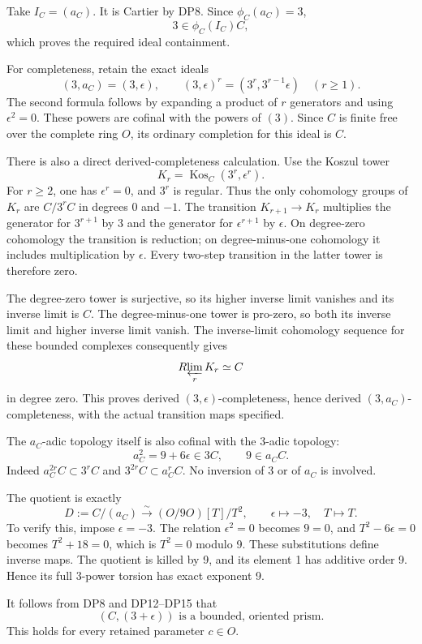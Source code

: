 \documentclass[
  10pt,
  a4paper,
]{article}
\begin{document}
Take \(I_C=(a_C)\). It is Cartier by DP8. Since \(\phi_C(a_C)=3\), \[
3\in\phi_C(I_C)C,
\tag{DP12}
\] which proves the required ideal containment.

For completeness, retain the exact ideals \[
(3,a_C)=(3,\epsilon),\qquad
(3,\epsilon)^r=(3^r,3^{r-1}\epsilon)\quad(r\ge1).
\tag{DP13}
\] The second formula follows by expanding a product of \(r\) generators
and using \(\epsilon^2=0\). These powers are cofinal with the powers of
\((3)\). Since \(C\) is finite free over the complete ring \(O\), its
ordinary completion for this ideal is \(C\).

There is also a direct derived-completeness calculation. Use the Koszul
tower \[
K_r=\operatorname{Kos}_C(3^r,\epsilon^r).
\] For \(r\ge2\), one has \(\epsilon^r=0\), and \(3^r\) is regular. Thus
the only cohomology groups of \(K_r\) are \(C/3^rC\) in degrees 0 and
\(-1\). The transition \(K_{r+1}\to K_r\) multiplies the generator for
\(3^{r+1}\) by 3 and the generator for \(\epsilon^{r+1}\) by
\(\epsilon\). On degree-zero cohomology the transition is reduction; on
degree-minus-one cohomology it includes multiplication by \(\epsilon\).
Every two-step transition in the latter tower is therefore zero.

The degree-zero tower is surjective, so its higher inverse limit
vanishes and its inverse limit is \(C\). The degree-minus-one tower is
pro-zero, so both its inverse limit and higher inverse limit vanish. The
inverse-limit cohomology sequence for these bounded complexes
consequently gives \[
R\!\varprojlim_r K_r\simeq C
\] in degree zero. This proves derived \((3,\epsilon)\)-completeness,
hence derived \((3,a_C)\)-completeness, with the actual transition maps
specified.

The \(a_C\)-adic topology itself is also cofinal with the 3-adic
topology: \[
a_C^2=9+6\epsilon\in3C,\qquad9\in a_CC.
\tag{DP14}
\] Indeed \(a_C^{2r}C\subset3^rC\) and \(3^{2r}C\subset a_C^rC\). No
inversion of 3 or of \(a_C\) is involved.

The quotient is exactly \[
D:=C/(a_C)\xrightarrow{\sim}(O/9O)[T]/T^2,
\qquad \epsilon\mapsto-3,\quad T\mapsto T.
\tag{DP15}
\] To verify this, impose \(\epsilon=-3\). The relation \(\epsilon^2=0\)
becomes \(9=0\), and \(T^2-6\epsilon=0\) becomes \(T^2+18=0\), which is
\(T^2=0\) modulo 9. These substitutions define inverse maps. The
quotient is killed by 9, and its element 1 has additive order 9. Hence
its full \(3\)-power torsion has exact exponent 9.

It follows from DP8 and DP12--DP15 that \[
\boxed{(C,(3+\epsilon))\text{ is a bounded, oriented prism}.}
\tag{DP16}
\] This holds for every retained parameter \(c\in O\).
\end{document}
